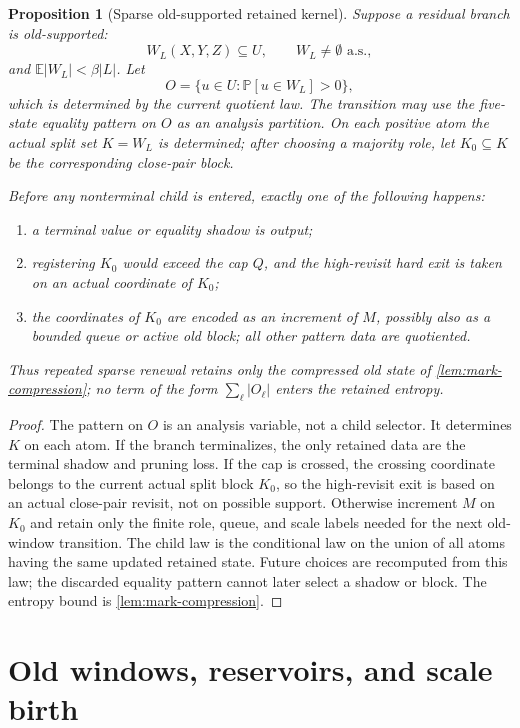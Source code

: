 \documentclass[11pt]{article}
\newcommand{\Cref}[1]{\ref{#1}}
\newtheorem{proposition}[theorem]{Proposition}
\theoremstyle{remark}
\newcommand{\E}{\mathbb E}
\newcommand{\Prob}{\mathbb P}
\begin{document}
\begin{proposition}[Sparse old-supported retained kernel]\label{prop:sparse-old}
Suppose a residual branch is old-supported:
\[
        W_L(X,Y,Z)\subseteq U,
        \qquad W_L\ne\emptyset \text{ a.s.},
\]
and $\E|W_L|<\beta |L|$.  Let
\[
        O=\{u\in U:\Prob[u\in W_L]>0\},
\]
which is determined by the current quotient law.  The transition may use the five-state equality pattern on $O$ as an analysis partition.  On each positive atom the actual split set $K=W_L$ is determined; after choosing a majority role, let $K_0\subseteq K$ be the corresponding close-pair block.

Before any nonterminal child is entered, exactly one of the following happens:
\begin{enumerate}[label=\textup{(\roman*)}]
\item a terminal value or equality shadow is output;
\item registering $K_0$ would exceed the cap $Q$, and the high-revisit hard exit is taken on an actual coordinate of $K_0$;
\item the coordinates of $K_0$ are encoded as an increment of $M$, possibly also as a bounded queue or active old block; all other pattern data are quotiented.
\end{enumerate}
Thus repeated sparse renewal retains only the compressed old state of \Cref{lem:mark-compression}; no term of the form $\sum_\ell |O_\ell|$ enters the retained entropy.
\end{proposition}

\begin{proof}
The pattern on $O$ is an analysis variable, not a child selector.  It determines $K$ on each atom.  If the branch terminalizes, the only retained data are the terminal shadow and pruning loss.  If the cap is crossed, the crossing coordinate belongs to the current actual split block $K_0$, so the high-revisit exit is based on an actual close-pair revisit, not on possible support.  Otherwise increment $M$ on $K_0$ and retain only the finite role, queue, and scale labels needed for the next old-window transition.  The child law is the conditional law on the union of all atoms having the same updated retained state.  Future choices are recomputed from this law; the discarded equality pattern cannot later select a shadow or block.  The entropy bound is \Cref{lem:mark-compression}.
\end{proof}

\section{Old windows, reservoirs, and scale birth}\label{sec:old-window}
\end{document}
